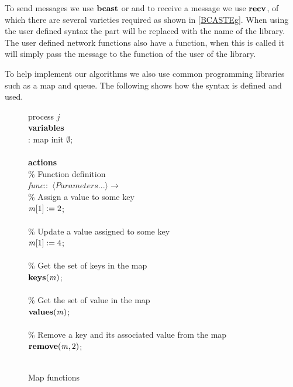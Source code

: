 To send messages we use $\mbox{\textbf{bcast}}$ or  and to receive a message we use $\mbox{\textbf{recv}}$, of which there are several varieties required as shown in \autoref{BCASTEg}. When using the user defined syntax the  part will be replaced with the name of the library. The user defined network functions also have a  function, when this is called it will simply pass the message to the  function of the user of the library. 

To help implement our algorithms we also use common programming libraries such as a map and queue. The following shows how the syntax is defined and used.

\begin{figure}[H]
  \centering
  \begin{boxedminipage}{\linewidth}
    \null process $j$\\
    \null \textbf{variables}\\
    \null\qq {}: map init $\emptyset$;\\~\\
    \null \textbf{actions}\\
    \null\qq \% Function definition\\
    \null\qq \emph{func}::~$\langle Parameters...\rangle \rightarrow$\\
    \null\qq\qq \% Assign a value to some key\\
    \null\qq\qq $\mbox{\emph{m}}[1] \mathrel{:=} 2$;\\~\\
    \null\qq\qq \% Update a value assigned to some key\\
    \null\qq\qq $\mbox{\emph{m}}[1] \mathrel{:=} 4$;\\~\\
    \null\qq\qq \% Get the set of keys in the map\\
    \null\qq\qq $\mbox{\textbf{keys}}(\mbox{\emph{m}})$;\\~\\
    \null\qq\qq \% Get the set of value in the map\\
    \null\qq\qq $\mbox{\textbf{values}}(\mbox{\emph{m}})$;\\~\\
    \null\qq\qq \% Remove a key and its associated value from the map\\
    \null\qq\qq $\mbox{\textbf{remove}}(\mbox{\emph{m}}, 2)$;\\~\\
  \end{boxedminipage}
  \caption{Map functions}
\end{figure}


